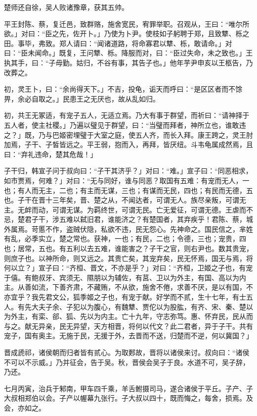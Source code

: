 \documentclass[]{article}
\begin{document}
楚师还自徐，吴人败诸豫章，获其五帅。

平王封陈、蔡，复迁邑，致群赂，施舍宽民，宥罪举职。召观从，王曰：``唯尔所欲。」对曰：``臣之先，佐开卜。」乃使为卜尹。使枝如子躬聘于郑，且致犨、栎之田。事毕，弗致。郑人请曰：``闻诸道路，将命寡君以犨、栎，敢请命。」对曰：``臣未闻命。」既复，王问犨、栎。降服而对，曰：``臣过失命，未之致也。」王执其手，曰：``子毋勤。姑归，不谷有事，其告子也。」他年芋尹申亥以王柩告，乃改葬之。

初，灵王卜，曰：``余尚得天下。」不吉，投龟，诟天而呼曰：``是区区者而不馀畀，余必自取之。」民患王之无厌也，故从乱如归。

初，共王无冢适，有宠子五人，无适立焉。乃大有事于群望，而祈曰：``请神择于五人者，使主社稷。」乃遍以璧见于群望，曰：``当璧而拜者，神所立也，谁敢违之？」既，乃与巴姬密埋璧于大室之庭，使五人齐，而长入拜。康王跨之，灵王肘加焉，子干、子皙皆远之。平王弱，抱而入，再拜，皆厌纽。斗韦龟属成然焉，且曰：``弃礼违命，楚其危哉！」

子干归，韩宣子问于叔向曰：``子干其济乎？」对曰：``难。」宣子曰：``同恶相求，如市贾焉，何难？」对曰：``无与同好，谁与同恶？取国有五难：有宠而无人，一也；有人而无主，二也；有主而无谋，三也；有谋而无民，四也；有民而无德，五也。子干在晋十三年矣，晋、楚之从，不闻达者，可谓无人。族尽亲叛，可谓无主。无衅而动，可谓无谋。为羁终世，可谓无民。亡无爱征，可谓无德。王虐而不忌，楚君子干，涉五难以弑旧君，谁能济之？有楚国者，其弃疾乎！君陈、蔡，城外属焉。苛慝不作，盗贼伏隐，私欲不违，民无怨心。先神命之。国民信之，芈姓有乱，必季实立，楚之常也。获神，一也；有民，二也；令德，三也；宠贵，四也；居常，五也。有五利以去五难，谁能害之？子干之官，则右尹也。数其贵宠，则庶子也。以神所命，则又远之。其贵亡矣，其宠弃矣，民无怀焉，国无与焉，将何以立？」宣子曰：``齐桓、晋文，不亦是乎？」对曰：``齐桓，卫姬之子也，有宠于僖。有鲍叔牙、宾须无、隰朋以为辅佐，有莒、卫以为外主，有国、高以为内主。从善如流，下善齐肃，不藏贿，不从欲，施舍不倦，求善不厌，是以有国，不亦宜乎？我先君文公，狐季姬之子也，有宠于献。好学而不贰，生十七年，有士五人。有先大夫子余、子犯以为腹心，有魏犨、贾佗以为股肱，有齐、宋、秦、楚以为外主，有栾、郤、狐、先以为内主。亡十九年，守志弥笃。惠、怀弃民，民从而与之。献无异亲，民无异望，天方相晋，将何以代文？此二君者，异于子干。共有宠子，国有奥主。无施于民，无援于外，去晋而不送，归楚而不逆，何以冀国？」

晋成虒祁，诸侯朝而归者皆有贰心。为取郠故，晋将以诸侯来讨。叔向曰：``诸侯不可以不示威。」乃并征会，告于吴。秋，晋侯会吴子于良。水道不可，吴子辞，乃还。

七月丙寅，治兵于邾南，甲车四千乘，羊舌鲋摄司马，遂合诸侯于平丘。子产、子大叔相郑伯以会。子产以幄幕九张行。子大叔以四十，既而悔之，每舍，损焉。及会，亦如之。
\end{document}
